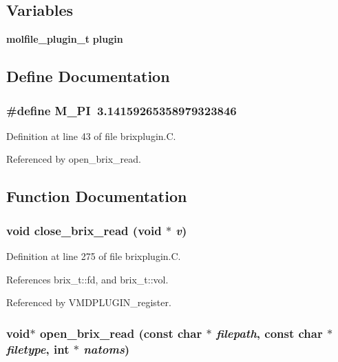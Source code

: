 \subsection*{Variables}
\begin{CompactItemize}
\item 
{\bf molfile\_\-plugin\_\-t} {\bf plugin}
\end{CompactItemize}


\subsection{Define Documentation}
\subsubsection{\setlength{\rightskip}{0pt plus 5cm}\#define M\_\-PI\ 3.14159265358979323846}\label{brixplugin_8C_a0}




Definition at line 43 of file brixplugin.C.

Referenced by open\_\-brix\_\-read.

\subsection{Function Documentation}
\subsubsection{\setlength{\rightskip}{0pt plus 5cm}void close\_\-brix\_\-read (void $\ast$ {\em v})\hspace{0.3cm}{\tt  [static]}}\label{brixplugin_8C_a5}




Definition at line 275 of file brixplugin.C.

References brix\_\-t::fd, and brix\_\-t::vol.

Referenced by VMDPLUGIN\_\-register.
\subsubsection{\setlength{\rightskip}{0pt plus 5cm}void$\ast$ open\_\-brix\_\-read (const char $\ast$ {\em filepath}, const char $\ast$ {\em filetype}, int $\ast$ {\em natoms})\hspace{0.3cm}{\tt  [static]}}\label{brixplugin_8C_a2}




